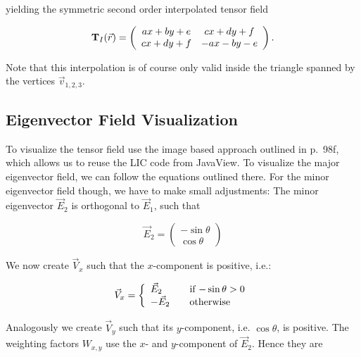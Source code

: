 \documentclass[a4paper,10pt,notitlepage]{scrartcl}
\newcommand{\mat}[1]{\mathbf{#1}}
\begin{document}
yielding the symmetric second order interpolated tensor field

\begin{equation}
 \mat{T}_I(\vec{r}) = \left(\begin{array}{c c}
                       ax + by + e & cx + dy + f \\
                       cx + dy + f & -ax -by -e
                      \end{array}\right).
 \label{eq:tf-linear}
\end{equation}

Note that this interpolation is of course only valid inside the triangle
spanned by the vertices $\vec{v}_{1,2,3}$.

\subsection{Eigenvector Field Visualization}

To visualize the tensor field use the image based approach outlined in
\cite{tfd} p.~98f, which allows us to reuse the LIC code from JavaView. To
visualize the major eigenvector field, we can follow the equations outlined
there. For the minor eigenvector field though, we have to make small
adjustments: The minor eigenvector $\vec{E}_2$ is orthogonal to $\vec{E}_1$,
such that

\begin{equation}
 \vec{E}_2 = \left( \begin{array}{c}
              -\sin \theta \\
              \cos \theta
             \end{array} \right)
\end{equation}

We now create $\vec{V}_x$ such that the $x$-component is positive, i.e.:

\begin{equation}
 \vec{V}_x = \left \{  \begin{array}{l l}
                       \vec{E}_2 & \quad \text{if $-\sin \theta > 0$} \\
                       -\vec{E}_2 & \quad \text{otherwise}
                       \end{array} \right.
\end{equation}

Analogously we create $\vec{V}_y$ such that its $y$-component, i.e. $\cos
\theta$, is positive. The weighting factors $W_{x,y}$ use the $x$- and
$y$-component of $\vec{E}_2$. Hence they are
\end{document}
